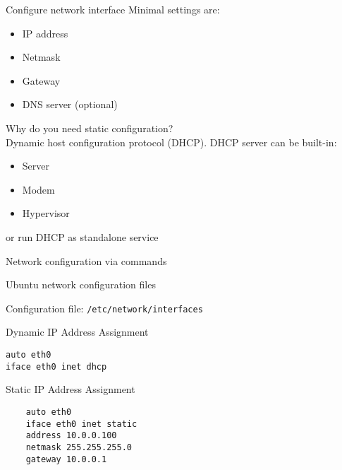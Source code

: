 \begin{frame}{Configure network interface}
Minimal settings are:
  \begin{itemize}
    \item IP address 
    \item Netmask 
	\item Gateway
    \item DNS server (optional)
  \end{itemize}
Why do you need static configuration? \\ 
Dynamic host configuration protocol (DHCP). DHCP server can be built-in:
  \begin{itemize}
	\item Server
    \item Modem 
    \item Hypervisor 
  \end{itemize}
	or run DHCP as standalone service
\end{frame}

\begin{frame}{Network configuration via commands}

\end{frame}

\begin{frame}[fragile]{Ubuntu network configuration files}

Configuration file: {\tt /etc/network/interfaces }

\begin{block}{Dynamic IP Address Assignment}
    \begin{lstlisting}
auto eth0
iface eth0 inet dhcp
    \end{lstlisting}
\end{block}

\begin{block}{Static IP Address Assignment}
    \begin{lstlisting}
    auto eth0
    iface eth0 inet static
    address 10.0.0.100
    netmask 255.255.255.0
    gateway 10.0.0.1
    \end{lstlisting}
\end{block}
\end{frame}

